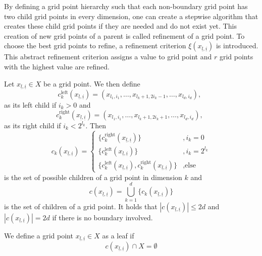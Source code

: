 \documentclass[
  a4paper,  %
  twoside,  %
  bibliography=totoc,
  headsepline,
  cleardoublepage=empty,
  parskip=half,
  draft=false
]{scrbook}
\begin{document}
By defining a grid point hierarchy such that each non-boundary grid point has two child grid points in every dimension, one can create a stepwise algorithm that creates these child grid points if they are needed and do not exist yet.
This creation of new grid points of a parent is called refinement of a grid point.
To choose the best grid points to refine, a refinement criterion $\xi(x_{\underline{l},\underline{i}})$ is introduced.
This abstract refinement criterion assigns a value to grid point and $r$ grid points with the highest value are refined.
\begin{definition}
Let $x_{\underline{l},\underline{i}} \in X$ be a grid point.
We then define
\begin{equation}
c_{k}^{\text{left}}(x_{\underline{l},\underline{i}})=(x_{l_1,i_1}, \dots, x_{l_k + 1,2  i_k - 1}, \dots, x_{l_d,i_d}), ~~ 
\end{equation}
as its left child if $i_k > 0$ and
\begin{equation}
c_{k}^{\text{right}}(x_{\underline{l},\underline{i}})=(x_{l_1,i_1}, \dots, x_{l_k + 1,2  i_k + 1}, \dots, x_{l_d,i_d}), ~~ 
\end{equation}
as its right child if $i_k < 2^{l_k}$.
Then
\begin{equation}
c_{k}(x_{\underline{l},\underline{i}})=
\begin{cases}
\{c_{k}^{\text{right}}(x_{\underline{l},\underline{i}})\}&, i_k=0\\
\{c_{k}^{\text{left}}(x_{\underline{l},\underline{i}})\}&,i_k= 2^{l_k}\\
\{c_{k}^{\text{left}}(x_{\underline{l},\underline{i}}),c_{k}^{\text{right}}(x_{\underline{l},\underline{i}}) \}&, \text{else}
\end{cases}
\end{equation}
is the set of possible children of a grid point in dimension $k$ and 
\begin{equation}
c(x_{\underline{l},\underline{i}})= \bigcup_{k=1}^d \{c_{k}(x_{\underline{l},\underline{i}})\}
\end{equation}
is the set of children of a grid point. It holds that $|c(x_{\underline{l},\underline{i}})| \leq 2d$ and $|c(x_{\underline{l},\underline{i}})| =2d$ if there is no boundary involved.
\end{definition}
\begin{definition}
We define a grid point $x_{\underline{l},\underline{i}} \in X$ as a leaf if
\begin{equation}
c(x_{\underline{l},\underline{i}}) \cap X = \emptyset
\end{equation}
\end{definition}
\end{document}
